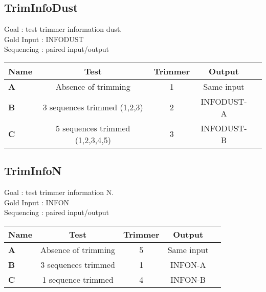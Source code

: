 \documentclass{article}
\begin{document}
\subsection{TrimInfoDust}
Goal : test trimmer information dust.\\
Gold Input : INFODUST\\
Sequencing : paired input/output
\begin{table}[H]
\begin{tabular}{|l|c|c|c|c|} \hline
    \textbf{Name} & \textbf{Test} & \textbf{Trimmer} & \textbf{Output} \\ \hline
    \textbf{A} & Absence of trimming & 1 & Same input\\ \hline
    \textbf{B} & 3 sequences trimmed (1,2,3) & 2 & INFODUST-A\\ \hline
    \textbf{C} & 5 sequences trimmed (1,2,3,4,5) & 3 & INFODUST-B\\ \hline
\end{tabular}
\end{table}

\subsection{TrimInfoN}
Goal : test trimmer information N.\\
Gold Input : INFON\\
Sequencing : paired input/output
\begin{table}[H]
\begin{tabular}{|l|c|c|c|c|} \hline
    \textbf{Name} & \textbf{Test} & \textbf{Trimmer} & \textbf{Output} \\ \hline
    \textbf{A} & Absence of trimming & 5 & Same input\\ \hline
    \textbf{B} & 3 sequences trimmed & 1 & INFON-A\\ \hline
    \textbf{C} & 1 sequence trimmed & 4 & INFON-B\\ \hline
\end{tabular}
\end{table}
\end{document}
